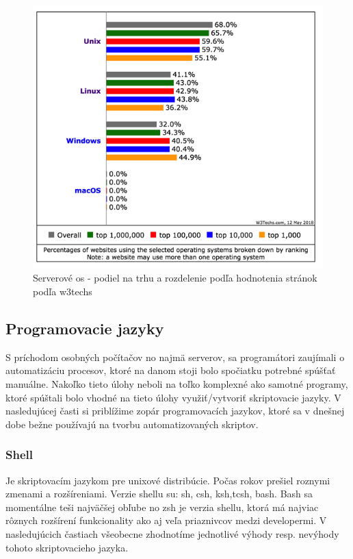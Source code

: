 \begin{figure}[!htbp]
	\centering
	\includegraphics[scale=0.4]{img/usage_grou_by_os_sites.png}
	\caption{Serverové \gls{os} - podiel na trhu a rozdelenie podľa hodnotenia stránok podľa w3techs\cite{pop}}
	\label{fig:test}
	
\end{figure}

\subsection{Programovacie jazyky}
\indent S príchodom osobných počítačov no najmä serverov, sa programátori zaujímali o automatizáciu procesov, ktoré na danom stoji bolo spočiatku potrebné spúšťať manuálne. Nakoľko tieto úlohy neboli na toľko komplexné ako samotné programy, ktoré spúštali bolo vhodné na tieto úlohy využiť/vytvoriť skriptovacie jazyky. V nasledujúcej časti si priblížime zopár programovacích jazykov, ktoré sa v dnešnej dobe bežne používajú na tvorbu automatizovaných skriptov.

\subsubsection{Shell}
\indent
Je skriptovacím jazykom pre unixové distribúcie. Počas rokov prešiel roznymi zmenami a rozšíreniami. Verzie shellu su: sh, csh, ksh,tcsh, bash. Bash sa momentálne teši najväčšej obľube no zsh je verzia shellu, ktorá má najviac rôznych rozšírení funkcionality ako aj veľa priaznivcov medzi developermi. V nasledujúcich častiach všeobecne zhodnotíme jednotlivé výhody resp. nevýhody tohoto skriptovacieho jazyka.

